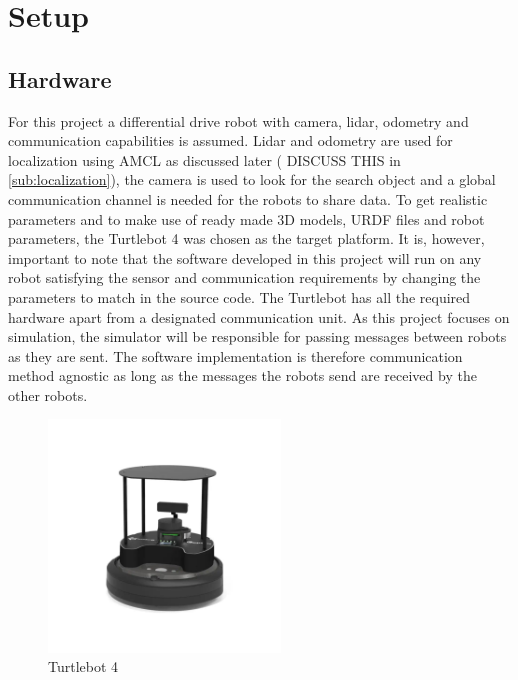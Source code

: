 \section{Setup}
\label{sec:setup}

\subsection{Hardware}

For this project a differential drive robot with camera, lidar, odometry and communication capabilities is assumed. Lidar and odometry are used for localization using AMCL as discussed later ({\color{red} DISCUSS THIS} in \cref{sub:localization}), the camera is used to look for the search object and a global communication channel is needed for the robots to share data. To get realistic parameters and to make use of ready made 3D models, URDF files and robot parameters, the Turtlebot 4 \cite{tb4} was chosen as the target platform. It is, however, important to note that the software developed in this project will run on any robot satisfying the sensor and communication requirements by changing the parameters to match in the source code. The Turtlebot has all the required hardware apart from a {\color{red} designated communication unit}. As this project focuses on simulation, the simulator will be responsible for passing messages between robots as they are sent. The software implementation is therefore {\color{red} communication method agnostic} as long as the messages the robots send are received by the other robots.

\begin{figure}[h]
    \begin{center}
        \includegraphics[width=0.55\textwidth]{figures/tb4.png}
    \end{center}
    \caption{Turtlebot 4}\label{fig:tb4}
\end{figure}



